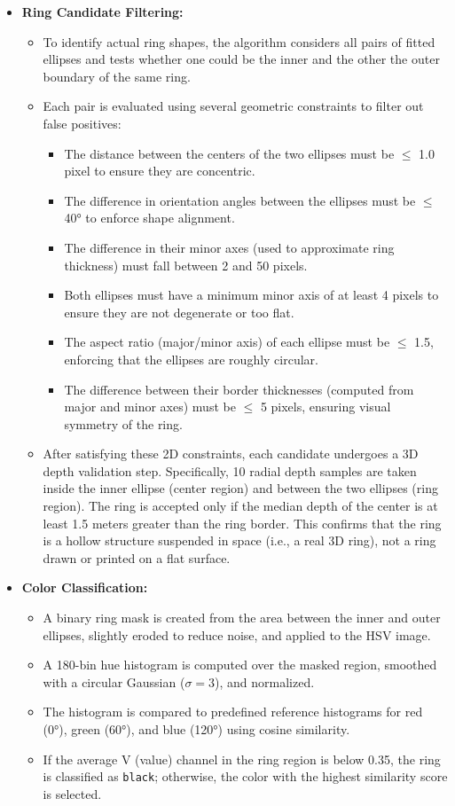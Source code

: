 \documentclass[a4paper]{article}
\begin{document}
\begin{itemize}
   \item \textbf{Ring Candidate Filtering:}
    \begin{itemize}
        \item To identify actual ring shapes, the algorithm considers all pairs of fitted ellipses and tests whether one could be the inner and the other the outer boundary of the same ring.
        \item Each pair is evaluated using several geometric constraints to filter out false positives:
        \begin{itemize}
            \item The distance between the centers of the two ellipses must be $\leq$ 1.0 pixel to ensure they are concentric.
            \item The difference in orientation angles between the ellipses must be $\leq$ 40° to enforce shape alignment.
            \item The difference in their minor axes (used to approximate ring thickness) must fall between 2 and 50 pixels.
            \item Both ellipses must have a minimum minor axis of at least 4 pixels to ensure they are not degenerate or too flat.
            \item The aspect ratio (major/minor axis) of each ellipse must be $\leq$ 1.5, enforcing that the ellipses are roughly circular.
            \item The difference between their border thicknesses (computed from major and minor axes) must be $\leq$ 5 pixels, ensuring visual symmetry of the ring.
        \end{itemize}
        \item After satisfying these 2D constraints, each candidate undergoes a 3D depth validation step. Specifically, 10 radial depth samples are taken inside the inner ellipse (center region) and between the two ellipses (ring region). The ring is accepted only if the median depth of the center is at least 1.5 meters greater than the ring border. This confirms that the ring is a hollow structure suspended in space (i.e., a real 3D ring), not a ring drawn or printed on a flat surface.
    \end{itemize}


    \item \textbf{Color Classification:}
    \begin{itemize}
        \item A binary ring mask is created from the area between the inner and outer ellipses, slightly eroded to reduce noise, and applied to the HSV image.
        \item A 180-bin hue histogram is computed over the masked region, smoothed with a circular Gaussian ($\sigma = 3$), and normalized.
        \item The histogram is compared to predefined reference histograms for red (0°), green (60°), and blue (120°) using cosine similarity.
        \item If the average V (value) channel in the ring region is below 0.35, the ring is classified as \texttt{black}; otherwise, the color with the highest similarity score is selected.
    \end{itemize}



\end{itemize}
\end{document}
